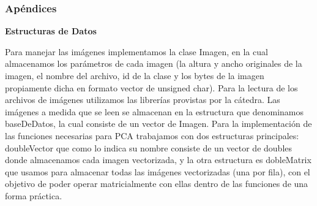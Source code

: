 \subsubsection*{Apéndices}
\textbf{Estructuras de Datos}

Para manejar las imágenes implementamos la clase Imagen, en la cual almacenamos los parámetros de cada imagen (la altura y ancho originales de la imagen, el nombre del archivo, id de la clase y los bytes de la imagen propiamente dicha en formato vector de unsigned char).
Para la lectura de los archivos de imágenes utilizamos las librerías provistas por la cátedra.
Las imágenes a medida que se leen se almacenan en la estructura que denominamos baseDeDatos, la cual consiste de un vector de Imagen.
Para la implementación de las funciones necesarias para PCA trabajamos con dos estructuras principales: doubleVector que como lo indica su nombre consiste de un vector de doubles donde almacenamos cada imagen vectorizada, y la otra estructura es dobleMatrix que usamos para almacenar todas las imágenes vectorizadas (una por fila), con el objetivo de poder operar matricialmente con ellas dentro de las funciones de una forma práctica.

